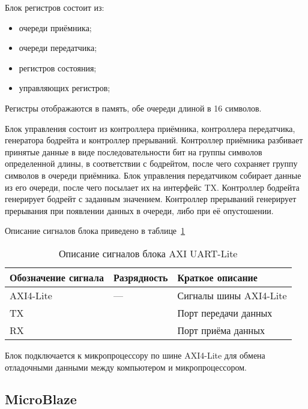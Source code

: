 Блок регистров состоит из:
\begin{itemize}
  \item очереди приёмника;
  \item очереди передатчика;
  \item регистров состояния;
  \item управляющих регистров;
\end{itemize}

Регистры отображаются в память, обе очереди длиной в 16 символов.

Блок управления состоит из контроллера приёмника, контроллера передатчика,
генератора бодрейта и контроллер прерываний. Контроллер приёмника разбивает
принятые данные в виде последовательности бит на группы символов определенной
длины, в соответствии с бодрейтом, после чего сохраняет группу символов в
очереди приёмника. Блок управления передатчиком собирает данные из его очереди,
после чего посылает их на интерфейс TX. Контроллер бодрейта генерирует
бодрейт с заданным значением. Контроллер прерываний генерирует прерывания при
появлении данных в очереди, либо при её опустошении.

Описание сигналов блока приведено в таблице~\ref{table:functional:axi_uart_lite:signals}

\begin{table}[ht!]
  \caption{Описание сигналов блока AXI UART-Lite}
  \label{table:functional:axi_uart_lite:signals}
  \begin{tabular}{| >{\centering}m{}
                  | >{\centering}m{}
                  | >{\centering\arraybackslash}m{}|}
   \hline
    Обозначение сигнала & Разрядность & Краткое описание \\
    \hline
    AXI4-Lite & --- & Сигналы шины AXI4-Lite \\
    \hline
    TX & 1 & Порт передачи данных \\
    \hline
    RX & 1 & Порт приёма данных \\
    \hline
  \end{tabular}
\end{table}

Блок подключается к микропроцессору по шине AXI4-Lite для обмена отладочными данными
между компьютером и микропроцессором.

\subsection{MicroBlaze}
\label{sec:functional:microblaze}

